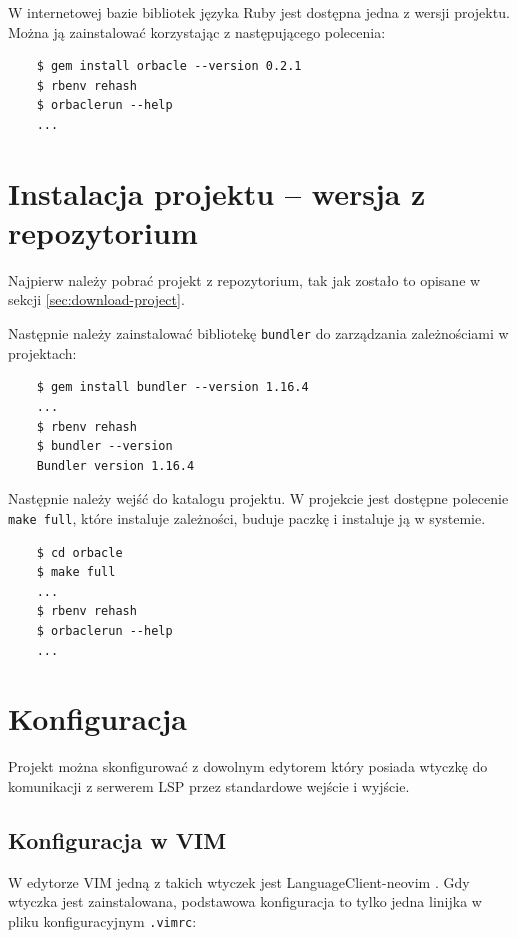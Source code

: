\documentclass[shortabstract,mgr]{iithesis}
\begin{document}
\begin{appendices}
W internetowej bazie bibliotek języka Ruby jest dostępna jedna z wersji projektu. Można ją zainstalować korzystając z następującego polecenia:

\begin{lstlisting}
    $ gem install orbacle --version 0.2.1
    $ rbenv rehash
    $ orbaclerun --help
    ...
\end{lstlisting}

\section{Instalacja projektu -- wersja z repozytorium}

Najpierw należy pobrać projekt z repozytorium, tak jak zostało to opisane w sekcji \ref{sec:download-project}.

Następnie należy zainstalować bibliotekę \texttt{bundler} do zarządzania zależnościami w projektach:

\begin{lstlisting}
    $ gem install bundler --version 1.16.4
    ...
    $ rbenv rehash
    $ bundler --version
    Bundler version 1.16.4
\end{lstlisting}

Następnie należy wejść do katalogu projektu. W projekcie jest dostępne polecenie \texttt{make full}, które instaluje zależności, buduje paczkę i instaluje ją w systemie.

\begin{lstlisting}
    $ cd orbacle
    $ make full
    ...
    $ rbenv rehash
    $ orbaclerun --help
    ...

\end{lstlisting}

\section{Konfiguracja}

Projekt można skonfigurować z dowolnym edytorem który posiada wtyczkę do komunikacji z serwerem LSP przez standardowe wejście i wyjście.

\subsection{Konfiguracja w VIM}

W edytorze VIM jedną z takich wtyczek jest LanguageClient-neovim \cite{LSPCLIENT}. Gdy wtyczka jest zainstalowana, podstawowa konfiguracja to tylko jedna linijka w pliku konfiguracyjnym \texttt{.vimrc}:


\end{appendices}
\end{document}

